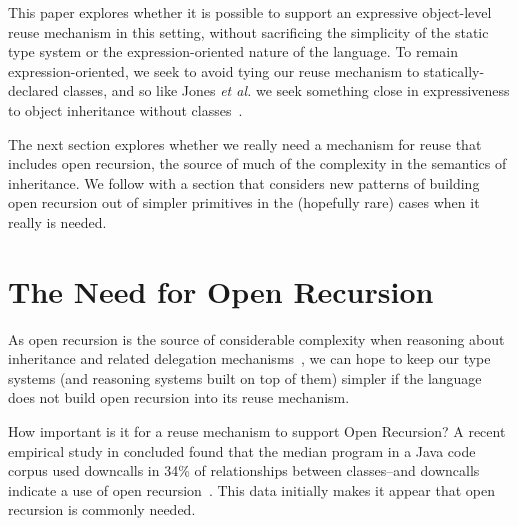 \documentclass[preprint]{sigplanconf}
\begin{document}
This paper explores whether it is possible to support an expressive
object-level reuse mechanism in this setting, without sacrificing
the simplicity of the static type system or the expression-oriented
nature of the language.  To remain expression-oriented, we seek to
avoid tying our reuse mechanism to statically-declared classes,
and so like Jones \textit{et al.} we seek something close in
expressiveness to object inheritance without
classes~\cite{jones:2016:inheritance}.

The next section explores whether we really need a mechanism for reuse
that includes open recursion, the source of much of the complexity in
the semantics of inheritance.  We follow with a section that considers
new patterns of building open recursion out of simpler primitives in the
(hopefully rare) cases when it really is needed.

\section{The Need for Open Recursion}

As open recursion is the source of considerable complexity when
reasoning about inheritance and related delegation
mechanisms~\cite{li:2015:ftfjp-typestate}, we can hope to keep our
type systems (and reasoning systems built on top of them) simpler if
the language does not build open recursion into its reuse mechanism.

How important is it for a reuse mechanism to support Open Recursion?
A recent empirical study in concluded found that the median program
in a Java code corpus used downcalls in 34\% of relationships
between classes--and downcalls indicate a use of open
recursion~\cite{tempero2013programmers}.
This data initially makes it appear that open recursion is commonly
needed.
\end{document}
